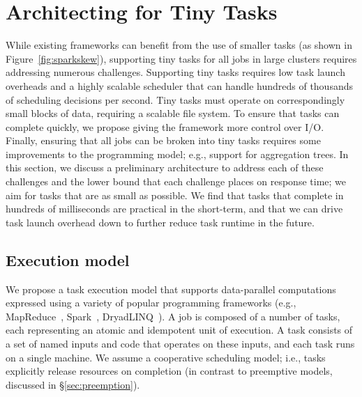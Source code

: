 \section{Architecting for Tiny Tasks}
\label{sec:architecture}

While existing frameworks can benefit from the use of smaller tasks (as shown
in Figure~\ref{fig:sparkskew}), supporting tiny tasks for all jobs in large clusters
requires addressing numerous challenges.
Supporting tiny tasks requires low task launch overheads and a highly scalable scheduler that can
handle hundreds of thousands of scheduling decisions per second.%
Tiny tasks must operate on correspondingly
small blocks of data, requiring a scalable file system. To ensure that
tasks can complete quickly, we propose giving the framework more control
over I/O.%
Finally, ensuring
that all jobs can be broken into tiny tasks requires some improvements
to the programming model; e.g., support for aggregation trees.
In this section, we discuss a preliminary architecture to address
each of these challenges and the lower bound that each challenge places
on response time; we aim for tasks that are as small as possible.
We find that tasks that complete in hundreds of milliseconds
are practical in the short-term, and that we can drive task launch overhead
down to further reduce task runtime in the future.

\subsection{Execution model}
We propose a task execution model that supports data-parallel computations
expressed using a variety of popular programming frameworks (e.g.,
MapReduce~\cite{dean2008mapreduce}, Spark~\cite{zaharia2010spark},
DryadLINQ~\cite{yu2008dryadlinq}).
A job is composed of a number of tasks, each representing an atomic
and idempotent unit of execution. A task consists of a set of named inputs
and code that operates on these inputs, and each task runs on a single machine.
We assume a cooperative scheduling model; i.e., tasks explicitly release
resources on completion (in contrast to preemptive models, discussed in
\S\ref{sec:preemption}).


